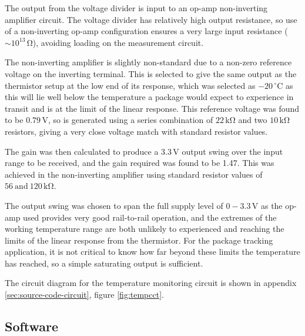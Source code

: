\documentclass[a4paper,10pt]{article}  %
\providecommand{\degrees}{\ensuremath{^{\circ}}}
\begin{document}
The output from the voltage divider is input to an op-amp
non-inverting amplifier circuit. The voltage divider has relatively
high output resistance, so use of a non-inverting op-amp configuration
ensures a very large input resistance ($\sim 10^{13}\,
\mathrm{\Omega}$), avoiding loading on the measurement circuit.

The non-inverting amplifier is slightly non-standard due to a non-zero
reference voltage on the inverting terminal. This is selected to give
the same output as the thermistor setup at the low end of its
response, which was selected as $-20\,\mathrm{\degrees C}$ as this
will lie well below the temperature a package would expect to
experience in transit and is at the limit of the linear response. This
reference voltage was found to be $0.79\,\mathrm{V}$, so is generated
using a series combination of $22\,\mathrm{k \Omega}$ and two
$10\,\mathrm{k \Omega}$ resistors, giving a very close voltage match
with standard resistor values.

The gain was then calculated to produce a $3.3\,\mathrm{V}$ output
swing over the input range to be received, and the gain required was
found to be 1.47. This was achieved in the non-inverting amplifier
using standard resistor values of $56\ \mathrm{and}\ 120\,\mathrm{k
  \Omega}$.

The output swing was chosen to span the full supply level of
$0-3.3\,\mathrm{V}$ as the op-amp used provides very good rail-to-rail
operation, and the extremes of the working temperature range are both
unlikely to experienced and reaching the limits of the linear response
from the thermistor. For the package tracking application, it is not
critical to know how far beyond these limits the temperature has
reached, so a simple saturating output is sufficient.

The circuit diagram for the temperature monitoring circuit is shown in
appendix \ref{sec:source-code-circuit}, figure \ref{fig:tempcct}.

\subsection{Software}
\label{sec:software}
\end{document}
